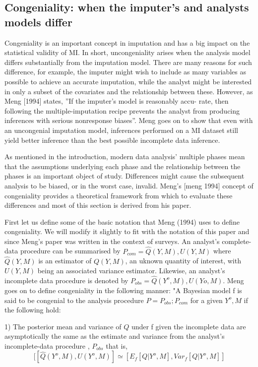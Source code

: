 \documentclass{article}
\begin{document}
	\subsection{Congeniality: when the imputer's and analysts models differ}
	Congeniality is an important concept in imputation and has a big impact on the statistical validity of MI. In short, uncongeniality arises when the analysis model differs substantially from the imputation model. There are many reasons for such difference, for example, the imputer might wish to include as many variables as possible to achieve an accurate imputation, while the analyst might be interested in only a subset of the covariates and the relationship between these. However, as Meng [1994] states, ''If the imputer's model is reasonably accu-
	rate, then following the multiple-imputation recipe
	prevents the analyst from producing inferences with
	serious nonresponse biases''. Meng goes on to show that even with an uncongenial imputation model, inferences performed on a MI dataset still yield better inference than the best possible incomplete data inference.
	
	As mentioned in the introduction, modern data analysis' multiple phases mean that the assumptions underlying each phase and the relationship between the phases is an important object of study. Differences might cause the subsequent analysis to be biased, or in the worst case, invalid. Meng's [meng 1994] concept of congeniality provides a theoretical framework from which to evaluate these differences and most of this section is derived from his paper.
	
	First let us define some of the basic notation that Meng (1994) uses to define congeniality. We will modify it slightly to fit with the notation of this paper and since Meng's paper was written in the context of surveys. An analyst's complete-data procedure can be summarised by $P_{com} = {\hat{Q}(Y, M), U(Y, M)}$ where $\hat{Q}(Y, M)$ is an estimator of $Q(Y, M)$, an uknown quantity of interest, with $U(Y, M)$ being an associated variance estimator. Likewise, an analyst's incomplete data procedure is denoted by $P_{obs} = {\hat{Q}(Y^{o}, M), U(Y{o}, M)}$. Meng goes on to define congeniality in the following manner: "A Bayesian model f is said to be congenial to the analysis procedure $P = {P_{obs};P_{com}}$ for a given ${Y^{o}, M}$ if the following hold:
	
	1) The posterior mean and variance of $Q$ under
	f given the incomplete data are asymptotically the
	same as the estimate and variance from the analyst's
	incomplete-data procedure , $P_{obs}$ that is, $$[[\hat{Q}(Y^{o}, M), U(Y^{o}, M)]\simeq [E_{f}[Q|{Y^{o}, M}], Var_{f}[Q|{Y^{o}, M}]]$$
	
\end{document}
